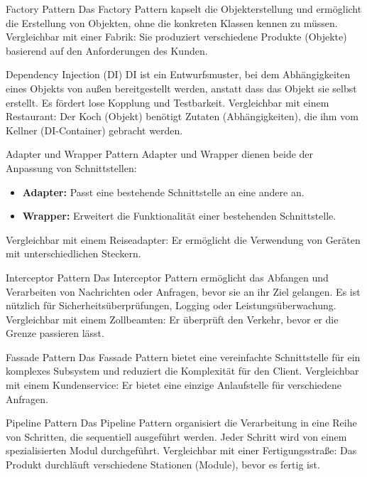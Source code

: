\documentclass{beamer}
\begin{document}
\begin{frame}{Factory Pattern}
    Das Factory Pattern kapselt die Objekterstellung und ermöglicht die Erstellung von Objekten, ohne die konkreten Klassen kennen zu müssen. Vergleichbar mit einer Fabrik: Sie produziert verschiedene Produkte (Objekte) basierend auf den Anforderungen des Kunden.
\end{frame}

\begin{frame}{Dependency Injection (DI)}
    DI ist ein Entwurfsmuster, bei dem Abhängigkeiten eines Objekts von außen bereitgestellt werden, anstatt dass das Objekt sie selbst erstellt. Es fördert lose Kopplung und Testbarkeit. Vergleichbar mit einem Restaurant: Der Koch (Objekt) benötigt Zutaten (Abhängigkeiten), die ihm vom Kellner (DI-Container) gebracht werden.
\end{frame}

\begin{frame}{Adapter und Wrapper Pattern}
    Adapter und Wrapper dienen beide der Anpassung von Schnittstellen:
    \begin{itemize}
        \item \textbf{Adapter:} Passt eine bestehende Schnittstelle an eine andere an.
        \item \textbf{Wrapper:} Erweitert die Funktionalität einer bestehenden Schnittstelle.
    \end{itemize}
    Vergleichbar mit einem Reiseadapter: Er ermöglicht die Verwendung von Geräten mit unterschiedlichen Steckern.
\end{frame}

\begin{frame}{Interceptor Pattern}
    Das Interceptor Pattern ermöglicht das Abfangen und Verarbeiten von Nachrichten oder Anfragen, bevor sie an ihr Ziel gelangen. Es ist nützlich für Sicherheitsüberprüfungen, Logging oder Leistungsüberwachung. Vergleichbar mit einem Zollbeamten: Er überprüft den Verkehr, bevor er die Grenze passieren lässt.
\end{frame}

\begin{frame}{Fassade Pattern}
    Das Fassade Pattern bietet eine vereinfachte Schnittstelle für ein komplexes Subsystem und reduziert die Komplexität für den Client. Vergleichbar mit einem Kundenservice: Er bietet eine einzige Anlaufstelle für verschiedene Anfragen.
\end{frame}

\begin{frame}{Pipeline Pattern}
    Das Pipeline Pattern organisiert die Verarbeitung in eine Reihe von Schritten, die sequentiell ausgeführt werden. Jeder Schritt wird von einem spezialisierten Modul durchgeführt. Vergleichbar mit einer Fertigungsstraße: Das Produkt durchläuft verschiedene Stationen (Module), bevor es fertig ist.
\end{frame}
\end{document}
